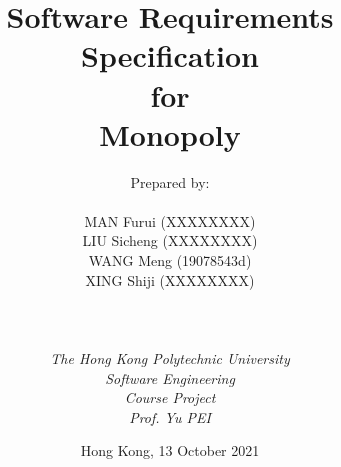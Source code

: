 
\def\Company{Consultancy}
\def\Institute{\textit{The Hong Kong Polytechnic University}}
\def\Course{\textit{Software Engineering}}
\def\Module{\textit{Course Project}}
\def\Docent{\textit{Prof. Yu PEI}}
\def\Assistant{\textit{}}

\def\BoldTitle{Software Requirements Specification}

\def\Subtitle{for \\ Monopoly \\}
\def\Authors{Prepared by:\\\\ MAN Furui (XXXXXXXX) \\ LIU Sicheng (XXXXXXXX) \\WANG Meng (19078543d) \\XING Shiji (XXXXXXXX) \\} 

\title{\textbf{\BoldTitle}\\\Subtitle}
\author{\Authors \\ \\ \\ \Institute\\ \Course\\ \Module\\ \Docent\\ \Assistant}
\date{Hong Kong, 13 October 2021}

